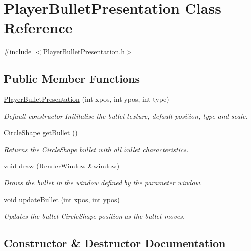 \hypertarget{class_player_bullet_presentation}{}\section{Player\+Bullet\+Presentation Class Reference}
\label{class_player_bullet_presentation}


{\ttfamily \#include $<$Player\+Bullet\+Presentation.\+h$>$}

\subsection*{Public Member Functions}
\begin{DoxyCompactItemize}
\item 
\hyperlink{class_player_bullet_presentation_a23a5d5d48c4baf65bc2a9beea2a5e3ef}{Player\+Bullet\+Presentation} (int xpos, int ypos, int type)
\begin{DoxyCompactList}\small\item\em Default constructor Inititalise the bullet texture, default position, type and scale. \end{DoxyCompactList}\item 
Circle\+Shape \hyperlink{class_player_bullet_presentation_a1f41436f86e00e6f2de1c81d66218790}{get\+Bullet} ()
\begin{DoxyCompactList}\small\item\em Returns the Circle\+Shape bullet with all bullet characteristics. \end{DoxyCompactList}\item 
void \hyperlink{class_player_bullet_presentation_ad75fe9d4316fc438389e1f323ac2c646}{draw} (Render\+Window \&window)
\begin{DoxyCompactList}\small\item\em Draws the bullet in the window defined by the parameter window. \end{DoxyCompactList}\item 
void \hyperlink{class_player_bullet_presentation_ad8a28adf4326c03c52af77c7b91c5a0a}{update\+Bullet} (int xpos, int ypos)
\begin{DoxyCompactList}\small\item\em Updates the bullet Circle\+Shape position as the bullet moves. \end{DoxyCompactList}\end{DoxyCompactItemize}


\subsection{Constructor \& Destructor Documentation}
\mbox{\label{class_player_bullet_presentation_a23a5d5d48c4baf65bc2a9beea2a5e3ef}} 
